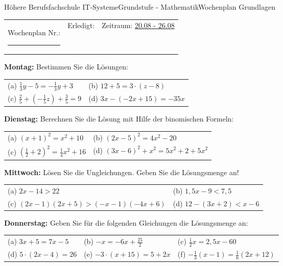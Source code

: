 \documentclass[oneside,openany,headings=optiontotoc,11pt,numbers=noenddot]{scrreprt}
\begin{document}
	\begin{worksheet}{Höhere Berufsfachschule IT-Systeme}{Grundstufe - Mathematik}{Wochenplan Grundlagen}
		\noindent
		\begin{tabularx}{\textwidth}{XXl}
			Wochenplan Nr.: \rule{0.15\textwidth}{1pt} & Erledigt: & Zeitraum: \underline{20.08 - 26.08}
		\end{tabularx}
	
		\begin{framed}
			\noindent
			\textbf{Montag:} Bestimmen Sie die Lösungen:\\
			\begin{tabularx}{\textwidth}{XX}
				(a) \(\frac{1}{3}y -5 = -\frac{1}{3}y + 3\) & (b) \(12 +5 = 3\cdot{}(z-8)\)\\
				(c) \(\frac{2}{5}+(-\frac{1}{5}z) + \frac{3}{5} = 9\) & (d) \(3x -(-2x+15) = -35x\)
			\end{tabularx}
		\end{framed}
		\begin{framed}
			\noindent
			\textbf{Dienstag:} Berechnen Sie die Lösung mit Hilfe der binomischen Formeln:\\
			\begin{tabularx}{\textwidth}{XX}
				(a) \((x+1)^2 = x^2 + 10\) & (b) \((2x-5)^2 = 4x^2 -20\)\\
				(c) \((\frac{1}{2} + 2)^2 = \frac{1}{4}x^2 +16\) & (d) \((3x-6)^2 + x^2 = 5x^2 +2 +5x^2\)
			\end{tabularx}
		\end{framed}
		\begin{framed}
			\noindent
			\textbf{Mittwoch:} Lösen Sie die Ungleichungen. Geben Sie die Lösungsmenge an!\\
			\begin{tabularx}{\textwidth}{XX}
				(a) \(2x -14 > 22\) & (b) \(1,5x-9 < 7,5\)\\
				(c) \((2x-1)(2x+5) > (-x-1)(-4x+6)\) & (d) \(12-(3x+2) < x-6\)
			\end{tabularx}
		\end{framed}
		\begin{framed}
			\noindent
			\textbf{Donnerstag:} Geben Sie für die folgenden Gleichungen die Lösungsmenge an:\\
			\begin{tabularx}{\textwidth}{XXX}
				(a) \(3x+5 = 7x - 5\) & (b) \(-x = -6x + \frac{25}{2}\) & (c) \(\frac{1}{2}x = 2,5x-60\)\\
				(d) \(5\cdot(2x-4) = 26\) & (e) \(-3\cdot(x+15) = 5 +2x\) & (f) \(-\frac{1}{3}(x-1) = \frac{1}{6}(2x+12)\)

\end{tabularx}
\end{framed}
\end{worksheet}
\end{document}
